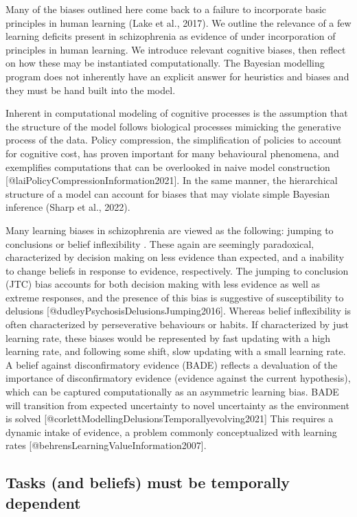 \documentclass{article}
\begin{document}
Many of the biases outlined here come back to a failure to incorporate basic principles in human learning (Lake et al., 2017). We outline the relevance of a few learning deficits present in schizophrenia as evidence of under incorporation of principles in human learning. We introduce relevant cognitive biases, then reflect on how these may be instantiated computationally. The Bayesian modelling program does not inherently have an explicit answer for heuristics and biases and they must be hand built into the model.

Inherent in computational modeling of cognitive processes is the assumption that the structure of the model follows biological processes mimicking the generative process of the data. Policy compression, the simplification of policies to account for cognitive cost, has proven important for many behavioural phenomena, and exemplifies computations that can be overlooked in naive model construction [@laiPolicyCompressionInformation2021]. In the same manner, the hierarchical structure of a model can account for biases that may violate simple Bayesian inference (Sharp et al., 2022).

Many learning biases in schizophrenia are viewed as the following: jumping to conclusions or belief inflexibility . These again are seemingly paradoxical, characterized by decision making on less evidence than expected, and a inability to change beliefs in response to evidence, respectively. The jumping to conclusion (JTC) bias accounts for both decision making with less evidence as well as extreme responses, and the presence of this bias is suggestive of susceptibility to delusions [@dudleyPsychosisDelusionsJumping2016]. Whereas belief inflexibility is often characterized by perseverative behaviours or habits. If characterized by just learning rate, these biases would be represented by fast updating with a high learning rate, and following some shift, slow updating with a small learning rate. A belief against disconfirmatory evidence (BADE) reflects a devaluation of the importance of disconfirmatory evidence (evidence against the current hypothesis), which can be captured computationally as an asymmetric learning bias. BADE will transition from expected uncertainty to novel uncertainty as the environment is solved [@corlettModellingDelusionsTemporallyevolving2021] This requires a dynamic intake of evidence, a problem commonly conceptualized with learning rates [@behrensLearningValueInformation2007].

\subsection{Tasks (and beliefs) must be temporally dependent}
\end{document}
